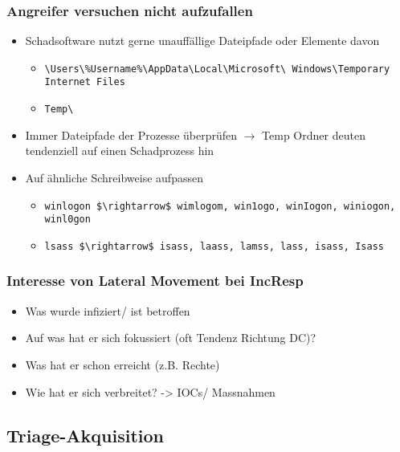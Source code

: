 \subsubsection{Angreifer versuchen nicht aufzufallen}
\begin{itemize}
    \item Schadsoftware nutzt gerne unauffällige Dateipfade oder Elemente davon
    \begin{itemize}
        \item \lstinline|\Users\%Username%\AppData\Local\Microsoft\ Windows\Temporary Internet Files|
        \item \lstinline|Temp\|
    \end{itemize}
    \item Immer Dateipfade der Prozesse überprüfen $\rightarrow$ Temp Ordner deuten tendenziell auf einen Schadprozess hin
    \item Auf ähnliche Schreibweise aufpassen
    \begin{itemize}
        \item \lstinline|winlogon $\rightarrow$ wimlogom, win1ogo, winIogon, winiogon, winl0gon|
        \item \lstinline|lsass $\rightarrow$ isass, laass, lamss, lass, isass, Isass|
    \end{itemize}
\end{itemize}

\subsubsection{Interesse von Lateral Movement bei IncResp}
\begin{itemize}
    \item Was wurde infiziert/ ist betroffen
    \item Auf was hat er sich fokussiert (oft Tendenz Richtung DC)?
    \item Was hat er schon erreicht (z.B. Rechte)
    \item Wie hat er sich verbreitet? -> IOCs/ Massnahmen
\end{itemize}

\subsection{Triage-Akquisition}

